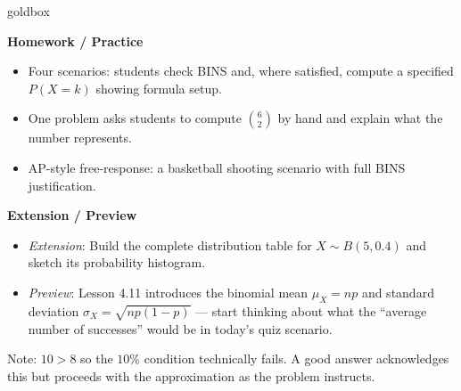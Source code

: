\documentclass[10pt]{article}
\begin{document}
\begin{skillbox}{goldbox}
\begin{minipage}[t]{0.48\linewidth}
    \textbf{Homework / Practice}
    \begin{itemize}
        \item Four scenarios: students check BINS and, where satisfied, compute
              a specified $P(X = k)$ showing formula setup.
        \item One problem asks students to compute $\binom{6}{2}$ by hand and
              explain what the number represents.
        \item AP-style free-response: a basketball shooting scenario with full
              BINS justification.
    \end{itemize}
\end{minipage}
\hfill
\begin{minipage}[t]{0.48\linewidth}
    \textbf{Extension / Preview}
    \begin{itemize}
        \item \textit{Extension}: Build the complete distribution table for
              $X \sim B(5, 0.4)$ and sketch its probability histogram.
        \item \textit{Preview}: Lesson 4.11 introduces the binomial mean
              $\mu_X = np$ and standard deviation $\sigma_X = \sqrt{np(1-p)}$
              --- start thinking about what the ``average number of successes''
              would be in today's quiz scenario.
    \end{itemize}
\end{minipage}
\end{skillbox}


\begin{teachernote}
Note: $10 > 8$ so the $10\%$ condition technically fails. A good answer acknowledges this but proceeds with the approximation as the problem instructs.
\end{teachernote}
\end{document}
